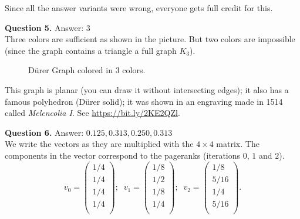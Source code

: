 \documentclass[jou]{apa6}
\begin{document}
Since all the answer variants were wrong, everyone gets full credit for this.




\vspace{10pt}
{\bf Question 5.} Answer: $3$\\
Three colors are sufficient as shown in the picture. 
But two colors are impossible (since the graph contains a triangle \textendash{}
a full graph $K_3$). 

\begin{figure}[!htb]
\caption{\label{fig:durer-graph-colored} D\"{u}rer Graph colored in $3$ colors.}
\end{figure}

This graph is planar (you can draw it without intersecting edges); 
it also has a famous 
polyhedron (D\"{u}rer solid); it was shown in an engraving 
made in 1514 called {\em Melencolia I}. See
\url{https://bit.ly/2KE2QZl}. 



\vspace{10pt}
{\bf Question 6.} Answer: $0.125,0.313,0.250,0.313$\\
We write the vectors as they are multiplied with the 
$4 \times 4$ matrix. The components in the vector 
correspond to the pageranks (iterations $0$, $1$ and $2$). 
$$v_0 =  \left( \begin{array}{c}
1/4 \\
1/4 \\
1/4 \\
1/4 \\
\end{array} \right);\;\;
v_1 = \left( \begin{array}{c}
1/8 \\
1/2 \\
1/8 \\
1/4 \\
\end{array} \right);\;\;
v_2 = \left( \begin{array}{c}
1/8 \\
5/16 \\
1/4 \\
5/16 \\
\end{array} \right).$$
\end{document}
